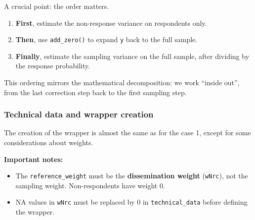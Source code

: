 \documentclass[
]{article}
\newenvironment{Shaded}{\begin{snugshade}}{\end{snugshade}}
\newcommand{\AttributeTok}[1]{\textcolor[rgb]{0.13,0.29,0.53}{#1}}
\newcommand{\FunctionTok}[1]{\textcolor[rgb]{0.13,0.29,0.53}{\textbf{#1}}}
\newcommand{\NormalTok}[1]{#1}
\newcommand{\OtherTok}[1]{\textcolor[rgb]{0.56,0.35,0.01}{#1}}
\newcommand{\SpecialCharTok}[1]{\textcolor[rgb]{0.81,0.36,0.00}{\textbf{#1}}}
\newcommand{\StringTok}[1]{\textcolor[rgb]{0.31,0.60,0.02}{#1}}
\providecommand{\tightlist}{%
  \setlength{\itemsep}{0pt}\setlength{\parskip}{0pt}}
\begin{document}
A crucial point: the order matters.

\begin{enumerate}
\def\labelenumi{\arabic{enumi}.}
\tightlist
\item
  \textbf{First}, estimate the non-response variance on respondents
  only.
\item
  \textbf{Then}, use \texttt{add\_zero()} to expand \texttt{y} back to
  the full sample.
\item
  \textbf{Finally}, estimate the sampling variance on the full sample,
  after dividing by the response probability.
\end{enumerate}

This ordering mirrors the mathematical decomposition: we work ``inside
out'', from the last correction step back to the first sampling step.

\subsubsection{Technical data and wrapper
creation}\label{technical-data-and-wrapper-creation}

The creation of the wrapper is almost the same as for the case 1, except
for some considerations about weights.

\begin{Shaded}
\end{Shaded}

\textbf{Important notes:}

\begin{itemize}
\tightlist
\item
  The \texttt{reference\_weight} must be the \textbf{dissemination
  weight} (\texttt{wNrc}), not the sampling weight. Non-respondents have
  weight 0.
\item
  NA values in \texttt{wNrc} must be replaced by 0 in
  \texttt{technical\_data} before defining the wrapper.
\end{itemize}
\end{document}
